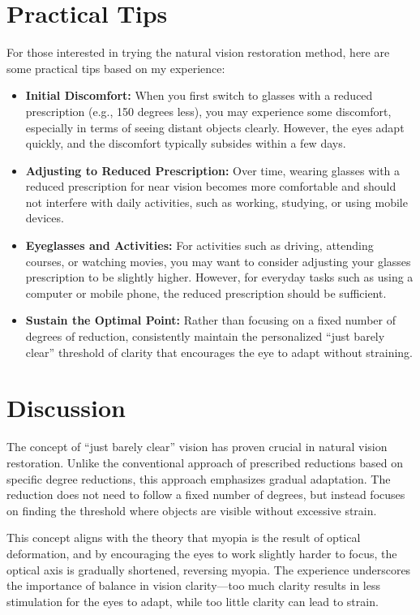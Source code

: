 \documentclass[12pt]{article}
\begin{document}
\section{Practical Tips}
For those interested in trying the natural vision restoration method, here are some practical tips based on my experience:
\begin{itemize}
    \item \textbf{Initial Discomfort:} When you first switch to glasses with a reduced prescription (e.g., 150 degrees less), you may experience some discomfort, especially in terms of seeing distant objects clearly. However, the eyes adapt quickly, and the discomfort typically subsides within a few days.
    \item \textbf{Adjusting to Reduced Prescription:} Over time, wearing glasses with a reduced prescription for near vision becomes more comfortable and should not interfere with daily activities, such as working, studying, or using mobile devices.
    \item \textbf{Eyeglasses and Activities:} For activities such as driving, attending courses, or watching movies, you may want to consider adjusting your glasses prescription to be slightly higher. However, for everyday tasks such as using a computer or mobile phone, the reduced prescription should be sufficient.
    \item \textbf{Sustain the Optimal Point:} Rather than focusing on a fixed number of degrees of reduction, consistently maintain the personalized ``just barely clear'' threshold of clarity that encourages the eye to adapt without straining.
\end{itemize}

\section{Discussion}
The concept of ``just barely clear'' vision has proven crucial in natural vision restoration. Unlike the conventional approach of prescribed reductions based on specific degree reductions, this approach emphasizes gradual adaptation. The reduction does not need to follow a fixed number of degrees, but instead focuses on finding the threshold where objects are visible without excessive strain.

This concept aligns with the theory that myopia is the result of optical deformation, and by encouraging the eyes to work slightly harder to focus, the optical axis is gradually shortened, reversing myopia. The experience underscores the importance of balance in vision clarity---too much clarity results in less stimulation for the eyes to adapt, while too little clarity can lead to strain.
\end{document}
